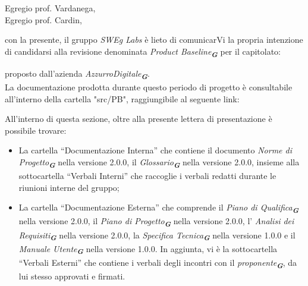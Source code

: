 
\fancyfoot[C]{\thepage} %



Egregio prof. Vardanega, \\
Egregio prof. Cardin, \\
\vspace{0.5cm}

con la presente, il gruppo \emph{SWEg Labs} è lieto di comunicarVi la propria intenzione di candidarsi alla revisione denominata
\emph{Product Baseline}\textsubscript{\textit{\textbf{G}}} per il capitolato:\\
\begin{center}
\end{center}
proposto dall’azienda \emph{AzzurroDigitale}\textsubscript{\textit{\textbf{G}}}.\\
La documentazione prodotta durante questo periodo di progetto è consultabile all’interno della cartella "src/PB",
raggiungibile al seguente link:
\begin{center}
\end{center}
All’interno di questa sezione, oltre alla presente lettera di presentazione è possibile trovare:
\begin{itemize}
    \item La cartella “Documentazione Interna” che contiene il documento \emph{Norme di Progetto}\textsubscript{\textit{\textbf{G}}} nella versione 2.0.0, il \emph{Glossario}\textsubscript{\textit{\textbf{G}}} nella versione 2.0.0, insieme alla sottocartella “Verbali Interni” che raccoglie i verbali redatti durante le riunioni interne del gruppo;
    \item La cartella “Documentazione Esterna” che comprende il \emph{Piano di Qualifica}\textsubscript{\textit{\textbf{G}}} nella versione 2.0.0, il \emph{Piano di Progetto}\textsubscript{\textit{\textbf{G}}} nella versione 2.0.0, l' \emph{Analisi dei Requisiti}\textsubscript{\textit{\textbf{G}}} nella versione 2.0.0, la \emph{Specifica Tecnica}\textsubscript{\textit{\textbf{G}}} nella versione 1.0.0 e il \emph{Manuale Utente}\textsubscript{\textit{\textbf{G}}} nella versione 1.0.0. In aggiunta, vi è la sottocartella “Verbali Esterni” che contiene i verbali degli incontri con il \emph{proponente}\textsubscript{\textit{\textbf{G}}}, da lui stesso approvati e firmati.
\end{itemize}
